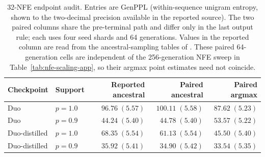 \documentclass{article}
\newcommand{\1}{\mathbf 1}
\theoremstyle{definition}
\begin{document}
\begin{table}[H]
\centering
\small
\setlength{\tabcolsep}{3.8pt}
\begin{tabular}{@{}llrrr@{}}
\toprule
Checkpoint & Support & Reported ancestral & Paired ancestral & Paired argmax \\
\midrule
Duo & $p=1.0$ & $96.76\;(5.57)$ & $100.11\;(5.58)$ & $87.62\;(5.23)$ \\
Duo & $p=0.9$ & $44.24\;(5.40)$ & $44.78\;(5.40)$ & $53.57\;(5.22)$ \\
Duo-distilled & $p=1.0$ & $68.35\;(5.54)$ & $61.13\;(5.54)$ & $45.50\;(5.40)$ \\
Duo-distilled & $p=0.9$ & $35.92\;(5.41)$ & $34.90\;(5.42)$ & $33.54\;(5.35)$ \\
\bottomrule
\end{tabular}
\caption{32-NFE endpoint audit. Entries are GenPPL (within-sequence unigram
entropy, shown to the two-decimal precision available in the reported source).
The two paired columns share the pre-terminal path and differ only in
the last output rule; each uses four seed shards and 64 generations. Values in
the reported column are read from the ancestral-sampling tables of
\mbox{\citet{deschenaux2026psi}}. These paired 64-generation cells are
independent of the 256-generation NFE sweep in
Table~\ref{tab:nfe-scaling-app}, so their argmax point estimates need not
coincide.}
\label{tab:deschenaux-endpoint-audit}
\end{table}
\end{document}
